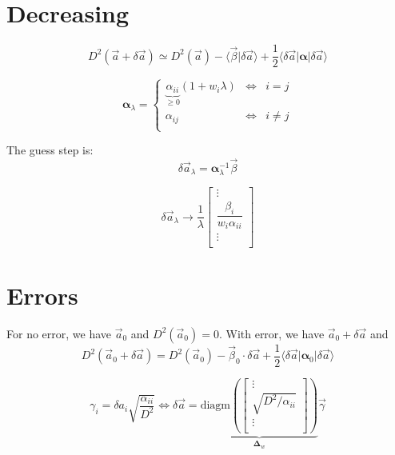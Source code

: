 \documentclass[aps,12pt]{revtex4}
\begin{document}
\section{Decreasing}

\begin{equation}
	 D^2(\vec{a} + \delta \vec{a}) \simeq 
	  D^2(\vec{a}) - \langle \vec{\beta} \vert \delta\vec{a} \rangle 
	  + \dfrac{1}{2} \langle \delta\vec{a} \vert \bm{\alpha}  \vert \delta\vec{a} \rangle 
\end{equation}


\begin{equation}
	\bm{\alpha}_\lambda =
	\left\lbrace
	\begin{array}{ccl}
	\underbrace{\alpha_{ii}}_{\geq0}(1+w_i\lambda) & \iff & i=j\\
	\alpha_{ij} & \iff & i \not= j \\
	\end{array}
	\right.
\end{equation}

The guess step is:
\begin{equation}
	\delta \vec{a}_\lambda = \bm{\alpha}_\lambda^{-1} \vec \beta
\end{equation}

\begin{equation}
	\delta \vec{a}_\lambda \to 
	\dfrac{1}{\lambda}
	\begin{bmatrix}
		\vdots\\
		\dfrac{ \beta_i }{w_i\alpha_{ii}}\\
		\vdots\\
	\end{bmatrix}
\end{equation}

\section{Errors}
For no error, we have $\vec{a}_0$ and $D^2(\vec{a}_0)=0$.
With error, we have $\vec{a}_0+\delta\vec{a}$ and 
\begin{equation}
D^2(\vec{a}_0+\delta\vec{a})=D^2(\vec{a}_0) - \vec{\beta}_0 \cdot \delta\vec{a} + \frac{1}{2} 
\langle \delta \vec{a} \vert \bm{\alpha}_0 \vert \delta \vec{a}\rangle
\end{equation}

\begin{equation}
	\gamma_i = \delta a_i \sqrt{\dfrac{\alpha_{ii}}{D^2}} \iff \delta \vec{a} = 
	\underbrace{
	\mathrm{diagm}
	\left(
	\begin{bmatrix}
	\vdots\\
	\sqrt{D^2/\alpha_{ii}}\\
	\vdots\\
	\end{bmatrix}
	\right)}_{\bm{\Delta}_w} \vec{\gamma}
\end{equation}
\end{document}
